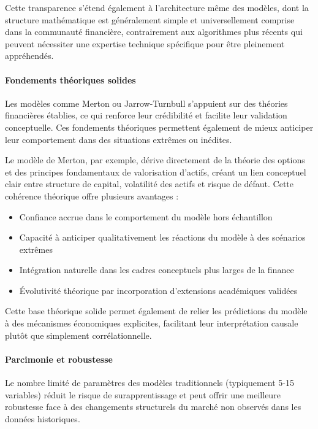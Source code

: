 Cette transparence s'étend également à l'architecture même des modèles, dont la structure mathématique est généralement simple et universellement comprise dans la communauté financière, contrairement aux algorithmes plus récents qui peuvent nécessiter une expertise technique spécifique pour être pleinement appréhendés.

\paragraph{Fondements théoriques solides}

Les modèles comme Merton ou Jarrow-Turnbull s'appuient sur des théories financières établies, ce qui renforce leur crédibilité et facilite leur validation conceptuelle. Ces fondements théoriques permettent également de mieux anticiper leur comportement dans des situations extrêmes ou inédites.

Le modèle de Merton, par exemple, dérive directement de la théorie des options et des principes fondamentaux de valorisation d'actifs, créant un lien conceptuel clair entre structure de capital, volatilité des actifs et risque de défaut. Cette cohérence théorique offre plusieurs avantages :
\begin{itemize}
    \item Confiance accrue dans le comportement du modèle hors échantillon
    \item Capacité à anticiper qualitativement les réactions du modèle à des scénarios extrêmes
    \item Intégration naturelle dans les cadres conceptuels plus larges de la finance
    \item Évolutivité théorique par incorporation d'extensions académiques validées
\end{itemize}

Cette base théorique solide permet également de relier les prédictions du modèle à des mécanismes économiques explicites, facilitant leur interprétation causale plutôt que simplement corrélationnelle.

\paragraph{Parcimonie et robustesse}

Le nombre limité de paramètres des modèles traditionnels (typiquement 5-15 variables) réduit le risque de surapprentissage et peut offrir une meilleure robustesse face à des changements structurels du marché non observés dans les données historiques.

